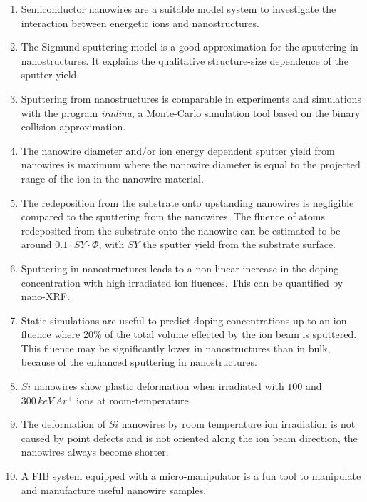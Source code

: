 \begin{enumerate}
\item{Semiconductor nanowires are a suitable model system to investigate the interaction between energetic ions and nanostructures.}
\item{The Sigmund sputtering model is a good approximation for the sputtering in nanostructures. It explains the qualitative structure-size dependence of the sputter yield.}
\item{Sputtering from nanostructures is comparable in experiments and simulations with the program \emph{iradina}, a Monte-Carlo simulation tool based on the binary collision approximation.}
\item{The nanowire diameter and/or ion energy dependent sputter yield from nanowires is maximum where the nanowire diameter is equal to the projected range of the ion in the nanowire material.}
\item{The redeposition from the substrate onto upstanding nanowires is negligible compared to the sputtering from the nanowires. The fluence of atoms redeposited from the substrate onto the nanowire can be estimated to be around $0.1\cdot SY \cdot \Phi$, with $SY$ the sputter yield from the substrate surface.}
\item{Sputtering in nanostructures leads to a non-linear increase in the doping concentration with high irradiated ion fluences. This can be quantified by nano-XRF.}
\item{Static simulations are useful to predict doping concentrations up to an ion fluence where 20\% of the total volume effected by the ion beam is sputtered. This fluence may be significantly lower in nanostructures than in bulk, because of the enhanced sputtering in nanostructures.}
\item{$Si$ nanowires show plastic deformation when irradiated with $100$ and $300\,keV\,Ar^+$ ions at room-temperature.} 
\item{The deformation of $Si$ nanowires by room temperature ion irradiation is not caused by point defects and is not oriented along the ion beam direction, the nanowires always become shorter.}
\item{A FIB system equipped with a micro-manipulator is a fun tool to manipulate and manufacture useful nanowire samples.}

\end{enumerate}

